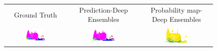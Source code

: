     \begin{figure}[h!]
        \centering
        \begin{tabular}{ccc}
            Ground Truth & Prediction-Deep Ensembles & Probability map-Deep Ensembles \\
            \includegraphics[width=0.33\textwidth, height=0.18\textheight]{images/seg_output/sem3d_seg_output/1_GT.pdf} &
            \includegraphics[width=0.33\textwidth, height=0.18\textheight]{images/seg_output/sem3d_seg_output/1_Pred.pdf}& 
            \includegraphics[width=0.33\textwidth, height=0.18\textheight]{images/seg_output/sem3d_seg_output/1_max_prob.pdf}\\


\end{tabular}
\end{figure}
